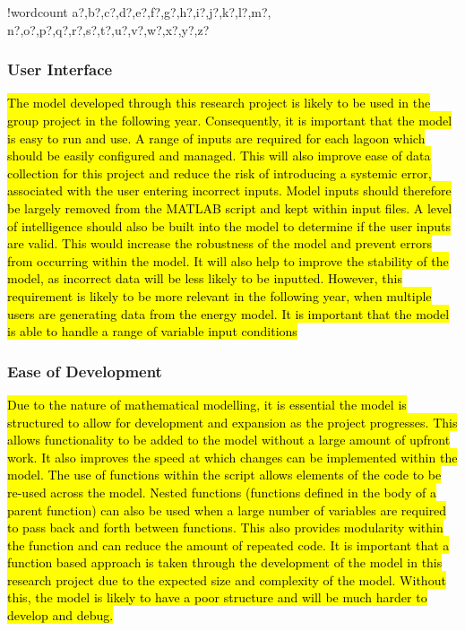 \documentclass[fontsize=9.5pt]{extarticle}
\numberwithin{figure}{section} %
\newcounter{words}
\newenvironment{counted}{%
  \setcounter{words}{0}
  \SearchList!{wordcount}{\stepcounter{words}}
    {a?,b?,c?,d?,e?,f?,g?,h?,i?,j?,k?,l?,m?,
    n?,o?,p?,q?,r?,s?,t?,u?,v?,w?,x?,y?,z?}
  \UndoBoundary{'}
  \SearchOrder{p;}}{%
  \StopSearching}
\begin{document}
\begin{counted}
\subsubsection{User Interface}\label{user-interface}

\hl{The model developed through this research project is likely to be used in the group project in the following year. Consequently, it is important that the model is easy to run and use. A range of inputs are required for each lagoon which should be easily configured and managed. This will also improve ease of data collection for this project and reduce the risk of introducing a systemic error, associated with the user entering incorrect inputs. Model inputs should therefore be largely removed from the MATLAB script and kept within input files.
A level of intelligence should also be built into the model to determine if the user inputs are valid. This would increase the robustness of the model and prevent errors from occurring within the model. It will also help to improve the stability of the model, as incorrect data will be less likely to be inputted. However, this requirement is likely to be more relevant in the following year, when multiple users are generating data from the energy model. It is important that the model is able to handle a range of variable input conditions}

\subsubsection{Ease of Development}\label{ease-of-development}

\hl{Due to the nature of mathematical modelling, it is essential the model is structured to allow for development and expansion as the project progresses. This allows functionality to be added to the model without a large amount of upfront work. It also improves the speed at which changes can be implemented within the model.
The use of functions within the script allows elements of the code to be re-used across the model. Nested functions (functions defined in the body of a parent function) can also be used when a large number of variables are required to pass back and forth between functions. This also provides modularity within the function and can reduce the amount of repeated code. It is important that a function based approach is taken through the development of the model in this research project due to the expected size and complexity of the model. Without this, the model is likely to have a poor structure and will be much harder to develop and debug.}


\end{counted}
\end{document}
